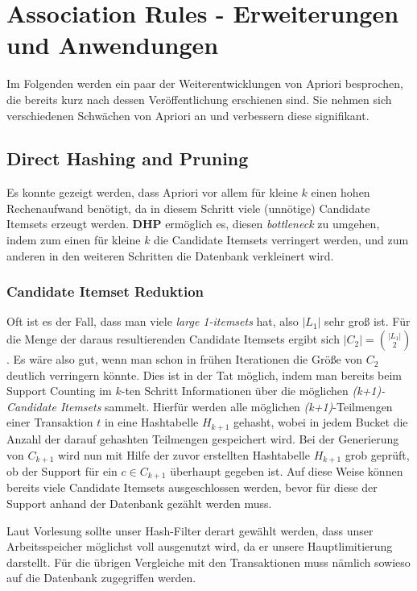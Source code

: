 \section{Association Rules - Erweiterungen und Anwendungen}
Im Folgenden werden ein paar der Weiterentwicklungen von Apriori besprochen,
die bereits kurz nach dessen Veröffentlichung erschienen sind. Sie nehmen sich
verschiedenen Schwächen von Apriori an und verbessern diese signifikant.

\subsection{Direct Hashing and Pruning}
Es konnte gezeigt werden, dass Apriori vor allem für kleine \(k\) einen
hohen Rechenaufwand benötigt, da in diesem Schritt viele (unnötige) Candidate
Itemsets erzeugt werden. \textbf{DHP} ermöglich es, diesen \textit{bottleneck}
zu umgehen, indem zum einen für kleine \(k\) die Candidate Itemsets verringert
werden, und zum anderen in den weiteren Schritten die Datenbank verkleinert wird.

\subsubsection{Candidate Itemset Reduktion}
Oft ist es der Fall, dass man viele \textit{large 1-itemsets} hat, also \(|L_1|\)
sehr groß ist. Für die Menge der daraus resultierenden Candidate Itemsets ergibt sich
\(|C_2| = {{|L_1|} \choose 2}\). Es wäre also gut, wenn man schon in frühen Iterationen
die Größe von \(C_2\) deutlich verringern könnte. Dies ist in der Tat möglich,
indem man bereits beim Support Counting im \(k\)-ten Schritt Informationen
über die möglichen \textit{(k+1)-Candidate Itemsets} sammelt. Hierfür werden
alle möglichen \textit{(k+1)}-Teilmengen einer Transaktion \(t\) in eine 
Hashtabelle \(H_{k+1}\) gehasht, wobei in jedem Bucket die Anzahl der darauf 
gehashten Teilmengen
gespeichert wird. Bei der Generierung von \(C_{k+1}\) wird nun mit Hilfe der zuvor 
erstellten Hashtabelle \(H_{k+1}\) grob geprüft, ob der Support für ein \(c\in C_{k+1}\)
überhaupt gegeben ist. Auf diese Weise können bereits viele Candidate Itemsets
ausgeschlossen werden, bevor für diese der Support anhand der Datenbank gezählt
werden muss.

Laut Vorlesung sollte unser Hash-Filter derart gewählt werden, dass unser Arbeitsspeicher
möglichst voll ausgenutzt wird, da er unsere Hauptlimitierung darstellt. Für die
übrigen Vergleiche mit den Transaktionen muss nämlich sowieso auf die Datenbank
zugegriffen werden.

